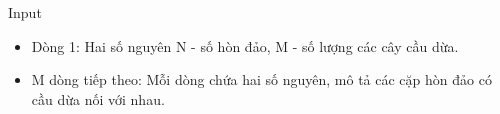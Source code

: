 Input  
\begin{itemize}
	\item     Dòng 1: Hai số nguyên N - số hòn đảo, M - số lượng các cây cầu dừa.   
	\item     M dòng tiếp theo: Mỗi dòng chứa hai số nguyên, mô tả các cặp hòn đảo có cầu dừa nối với nhau.   
\end{itemize}